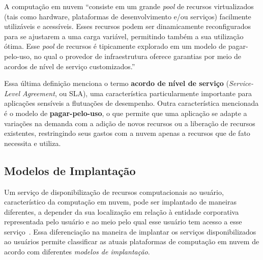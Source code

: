 \begin{citacao}
A computação em nuvem ``consiste em um grande \emph{pool} de recursos virtualizados 
(tais como hardware, plataformas de desenvolvimento e/ou serviços) facilmente 
utilizáveis e acessíveis. Esses recursos podem ser dinamicamente reconfigurados 
para se ajustarem a uma carga variável, permitindo também a sua utilização ótima. 
Esse \emph{pool} de recursos é tipicamente explorado em um modelo de pagar-pelo-uso, 
no qual o provedor de infraestrutura oferece garantias por meio de acordos de nível 
de serviço customizados.''\end{citacao}

Essa última definição menciona o termo \textbf{acordo de nível de serviço} (\emph{Service-Level Agreement}, ou SLA), uma característica particularmente importante para aplicações sensíveis a flutuações 
de desempenho. Outra característica mencionada é o modelo de \textbf{pagar-pelo-uso}, 
o que permite que uma aplicação se adapte a variações na demanda com a adição de 
novos recursos ou a liberação de recursos existentes, restringindo seus gastos 
com a nuvem apenas a recursos que de fato necessita e utiliza.

\subsection{Modelos de Implantação}

Um serviço de disponibilização de recursos computacionais ao usuário, característico da computação em nuvem, pode ser implantado de maneiras diferentes,
a depender da sua localização em relação à entidade corporativa representada pelo
usuário e ao meio pelo qual esse usuário tem acesso a esse 
serviço~\cite{armbrust2009above,Zhang2010}. Essa diferenciação na maneira de implantar os serviços disponibilizados ao usuários permite classificar as atuais plataformas de computação em nuvem de acordo com diferentes \emph{modelos de implantação}. 
 
